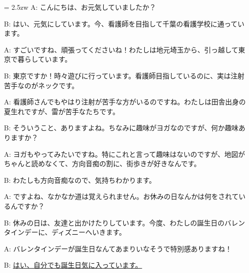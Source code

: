 \documentclass[11pt]{amsart}
\title{}
\author{}
\newenvironment{hangall}[1]{\hangindent = 2.5zw\everypar{\hangindent = 2.5zw}}{}
\begin{document}
\maketitle
\begin{hangall}{}%
A: こんにちは、お元気していましたか？

B: はい、元気にしています。今、看護師を目指して千葉の看護学校に通っています。

A: すごいですね、頑張ってくださいね！わたしは地元埼玉から、引っ越して東京で暮らしています。

B: 東京ですか！時々遊びに行っています。看護師目指しているのに、実は注射苦手なのがネックです。

A: 看護師さんでもやはり注射が苦手な方がいるのですね。わたしは田舎出身の夏生れですが、雷が苦手なたちです。

B: そういうこと、ありますよね。ちなみに趣味がヨガなのですが、何か趣味ありますか？

A: ヨガもやってみたいですね。特にこれと言って趣味はないのですが、地図がちゃんと読めなくて、方向音痴の割に、街歩きが好きなんです。

B: わたしも方向音痴なので、気持ちわかります。

A: ですよね、なかなか道は覚えられません。お休みの日なんかは何をされているんですか？

B: 休みの日は、友達と出かけたりしています。今度、わたしの誕生日のバレンタインデーに、ディズニーへいきます。

A: バレンタインデーが誕生日なんてあまりいなそうで特別感ありますね！

B: \ul{はい、自分でも誕生日気に入っています。}\end{hangall}
\end{document}
